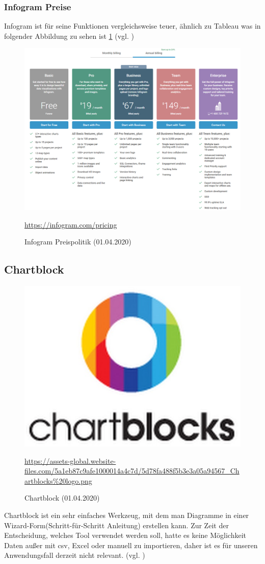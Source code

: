 \subsubsection{Infogram Preise}
Infogram ist für seine Funktionen vergleichsweise teuer, ähnlich zu Tableau was in folgender Abbildung zu sehen ist \ref{img:infogram_preise} (vgl. \cite{noauthor_infogram_2019-1})
\begin{figure}[H]
    \includegraphics[scale=.50]{images/Infogram_Preise.png}
    \caption{Infogram Preispolitik (01.04.2020)}
    \url{https://infogram.com/pricing}
    \label{img:infogram_preise}
\end{figure}
\subsection{Chartblock}
\begin{figure}[H]
    \includegraphics[scale=1]{images/chartblockLogo.PNG}
    \caption{Chartblock (01.04.2020)}
     \centering
     \url{https://assets-global.website-files.com/5a1eb87c9afe1000014a4c7d/5d78fa488f5b3e3a05a94567_Chartblocks%20logo.png} 
\end{figure}
Chartblock ist ein sehr einfaches Werkzeug, mit dem man Diagramme in einer Wizard-Form(Schritt-für-Schritt Anleitung) erstellen kann. Zur Zeit der Entscheidung, welches Tool verwendet werden soll, hatte es keine Möglichkeit Daten außer mit csv, Excel oder manuell zu importieren, daher ist es für unseren Anwendungsfall derzeit nicht relevant. (vgl. \cite{Chartblock})
